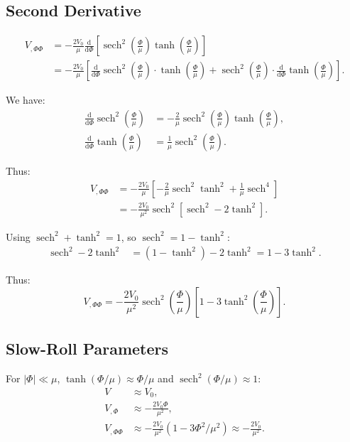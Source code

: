 \documentclass[11pt,a4paper]{article}
\numberwithin{equation}{section}
\theoremstyle{plain}
\theoremstyle{definition}
\theoremstyle{remark}
\newcommand{\dd}{\mathrm{d}}
\begin{document}
\subsection{Second Derivative}

\begin{align}
V_{,\Phi\Phi} &= -\frac{2V_0}{\mu}\frac{\dd}{\dd\Phi}\left[\operatorname{sech}^2\left(\frac{\Phi}{\mu}\right)\tanh\left(\frac{\Phi}{\mu}\right)\right]\\
&= -\frac{2V_0}{\mu}\left[\frac{\dd}{\dd\Phi}\operatorname{sech}^2\left(\frac{\Phi}{\mu}\right)\cdot\tanh\left(\frac{\Phi}{\mu}\right) + \operatorname{sech}^2\left(\frac{\Phi}{\mu}\right)\cdot\frac{\dd}{\dd\Phi}\tanh\left(\frac{\Phi}{\mu}\right)\right].
\end{align}

We have:
\begin{align}
\frac{\dd}{\dd\Phi}\operatorname{sech}^2\left(\frac{\Phi}{\mu}\right) &= -\frac{2}{\mu}\operatorname{sech}^2\left(\frac{\Phi}{\mu}\right)\tanh\left(\frac{\Phi}{\mu}\right),\\
\frac{\dd}{\dd\Phi}\tanh\left(\frac{\Phi}{\mu}\right) &= \frac{1}{\mu}\operatorname{sech}^2\left(\frac{\Phi}{\mu}\right).
\end{align}

Thus:
\begin{align}
V_{,\Phi\Phi} &= -\frac{2V_0}{\mu}\left[-\frac{2}{\mu}\operatorname{sech}^2\tanh^2 + \frac{1}{\mu}\operatorname{sech}^4\right]\\
&= -\frac{2V_0}{\mu^2}\operatorname{sech}^2\left[\operatorname{sech}^2 - 2\tanh^2\right].
\end{align}

Using $\operatorname{sech}^2 + \tanh^2 = 1$, so $\operatorname{sech}^2 = 1 - \tanh^2$:
\begin{align}
\operatorname{sech}^2 - 2\tanh^2 &= (1 - \tanh^2) - 2\tanh^2 = 1 - 3\tanh^2.
\end{align}

Thus:
\begin{equation}
V_{,\Phi\Phi} = -\frac{2V_0}{\mu^2}\operatorname{sech}^2\left(\frac{\Phi}{\mu}\right)\left[1 - 3\tanh^2\left(\frac{\Phi}{\mu}\right)\right].
\end{equation}

\subsection{Slow-Roll Parameters}

For $|\Phi| \ll \mu$, $\tanh(\Phi/\mu) \approx \Phi/\mu$ and $\operatorname{sech}^2(\Phi/\mu) \approx 1$:
\begin{align}
V &\approx V_0,\\
V_{,\Phi} &\approx -\frac{2V_0\Phi}{\mu^2},\\
V_{,\Phi\Phi} &\approx -\frac{2V_0}{\mu^2}(1 - 3\Phi^2/\mu^2) \approx -\frac{2V_0}{\mu^2}.
\end{align}
\end{document}
